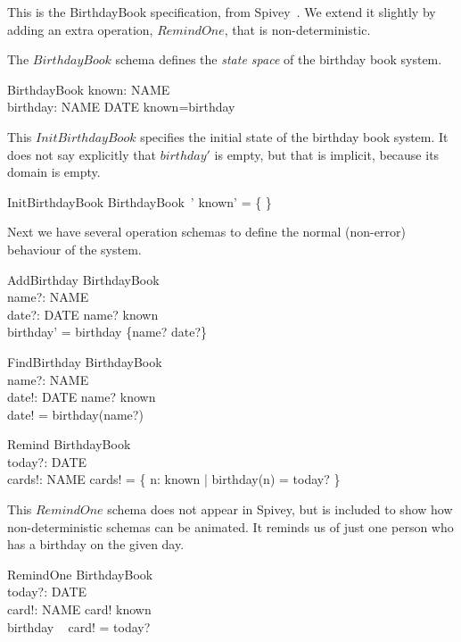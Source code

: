 \documentclass{article}
\begin{document}
This is the BirthdayBook specification, from
Spivey~\cite{spivey:z-notation2}.  We extend it slightly
by adding an extra operation, $RemindOne$, that is non-deterministic.

\begin{zed}
\end{zed}

The $BirthdayBook$ schema defines the \emph{state space} of
the birthday book system.

\begin{schema}{BirthdayBook}
    known: \power NAME \\
    birthday: NAME \pfun DATE
\where
    known=\dom birthday
\end{schema}

This $InitBirthdayBook$ specifies the initial state
of the birthday book system.  It does not say explicitly that
$birthday'$ is empty, but that is implicit, because its domain
is empty.

\begin{schema}{InitBirthdayBook}
    BirthdayBook~'
\where
    known' = \{ \}
\end{schema}

Next we have several operation schemas to define the normal (non-error)
behaviour of the system.

\begin{schema}{AddBirthday}
    \Delta BirthdayBook \\
    name?: NAME \\
    date?: DATE
\where
    name? \notin known
\\
    birthday' = birthday \cup \{name? \mapsto date?\}
\end{schema}

\begin{schema}{FindBirthday}
    \Xi BirthdayBook \\
    name?: NAME \\
    date!: DATE
\where
    name? \in known
\\
    date! = birthday(name?)
\end{schema}

\begin{schema}{Remind}
    \Xi BirthdayBook \\
    today?: DATE \\
    cards!: \power NAME
\where
    cards! = \{ n: known | birthday(n) = today? \}
\end{schema}

This $RemindOne$ schema does not appear in Spivey, but is
included to show how non-deterministic schemas can be animated.
It reminds us of just one person who has a birthday on the given
day.
\begin{schema}{RemindOne}
    \Xi BirthdayBook \\
    today?: DATE \\
    card!: NAME
\where
    card! \in known \\
    birthday ~ card! = today?
\end{schema}
\end{document}
